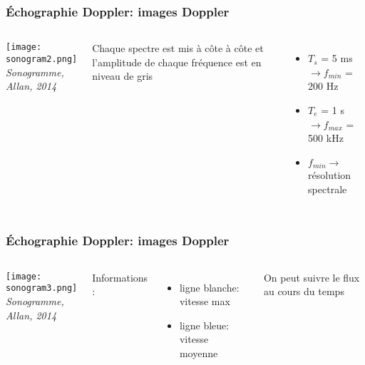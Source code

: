\documentclass{beamer}
\begin{document}
\begin{frame}
\frametitle{\'Echographie Doppler: images Doppler}
\begin{columns}
\column{60mm}
\begin{center}
\texttt{[image: sonogram2.png]}\\
\textit{\footnotesize Sonogramme, Allan, 2014}
\end{center}
\column{60mm}
Chaque spectre est mis à côte à côte et l'amplitude de chaque fréquence est en niveau de gris
\vspace{0.3cm}
\begin{itemize}
\item $T_s$ = 5 ms  $\rightarrow f_{min}$ = 200 Hz 
\vspace{0.3cm}
\item $T_e$ = 1 \textmu s $\rightarrow f_{max}$ = 500 kHz 
\vspace{0.3cm}
\item $f_{min} \rightarrow$ résolution spectrale
\end{itemize}
\end{columns}
\end{frame}

\begin{frame}
\frametitle{\'Echographie Doppler: images Doppler}
\begin{columns}
\column{80mm}
\begin{center}
\texttt{[image: sonogram3.png]}\\
\textit{\footnotesize Sonogramme, Allan, 2014}
\end{center}
\column{40mm}
Informations :
\vspace{0.3cm}
\begin{itemize}
\item ligne blanche: vitesse max 
\vspace{0.3cm}
\item ligne bleue: vitesse moyenne
\vspace{0.3cm}
\end{itemize}
On peut suivre le flux au cours du temps
\end{columns}
\end{frame}
\end{document}
